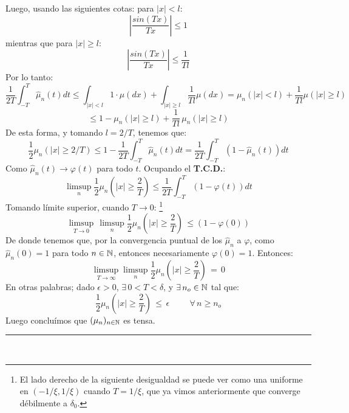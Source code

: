 \begin{itemize}
    Luego, usando las siguientes cotas: para $|x|<l$:
    \[\left|\frac{sin(Tx)}{Tx}\right| \leq 1\]
    mientras que para  $|x|\geq l$:
    \[\left|\frac{sin(Tx)}{Tx}\right| \leq \frac{1}{Tl}\]
    Por lo tanto:
    \[\frac{1}{2T}\int_{-T}^{T}\hat{\mu}_n(t)dt \leq \int_{|x|<l}1\cdot \mu(dx) + \int_{|x|\geq l}\frac{1}{Tl}\mu(dx) = \mu_n(|x|<l) +\frac{1}{Tl}\mu(|x|\geq l)\]
    \[\leq 1 - \mu_n(|x|\geq l) +\frac{1}{Tl}\,\mu_n(|x|\geq l)\]
    De esta forma, y tomando $l = 2/T$, tenemos que:
    \[\frac{1}{2}\mu_n(|x|\geq 2/T) \leq 1 - \frac{1}{2T}\int_{-T}^{T}\hat{\mu}_n(t)dt = \frac{1}{2T}\int_{-T}^{T}\left(1-\hat{\mu}_n(t)\right)dt\]
    Como $\hat{\mu}_n(t) \rightarrow\varphi(t)$ para todo $t$. Ocupando el \textbf{T.C.D.}:
    \[\limsup_{n}\frac{1}{2}\mu_n(|x|\geq \frac{2}{T}) \leq \frac{1}{2T}\int_{-T}^{T}(1-\varphi(t)) dt\]
    Tomando límite superior, cuando $T\rightarrow 0$: \footnote{El lado derecho de la siguiente desigualdad se puede ver como una uniforme en $(-1/\xi,1/\xi)$ cuando $T=1/\xi$, que ya vimos anteriormente que converge débilmente  a $\delta_0$.}
    \[\limsup_{T\to 0}\,\limsup_{n}\frac{1}{2}\mu_n(|x|\geq\frac{2}{T})\,\leq (1-\varphi(0))\]
    De donde tenemos que, por la convergencia puntual de los $\hat{\mu}_n$ a $\varphi$, como $\hat{\mu}_n(0)=1$ para todo $n\in\mathbb N$, entonces necesariamente $\varphi(0)=1$. Entonces:
    \[\limsup_{T\to \infty}\limsup_{n}\frac{1}{2}\mu_n(|x|\geq\frac{2}{T})\,=\, 0\]
    En otras palabras; dado $\epsilon >0$, $\exists\,0<T<\delta$, y $\exists\,n_o \in \mathbb N$ tal que:
    \[\frac{1}{2}\mu_n(|x|\geq \frac{2}{T})\,\leq\,\epsilon\hspace{1cm}\forall\,n\geq n_o\]
    Luego concluímos que $(\mu_n)_{n\in\mathbb N}$ es tensa. \rule{0.7em}{0.7em}\\ \newline
\end{itemize}


